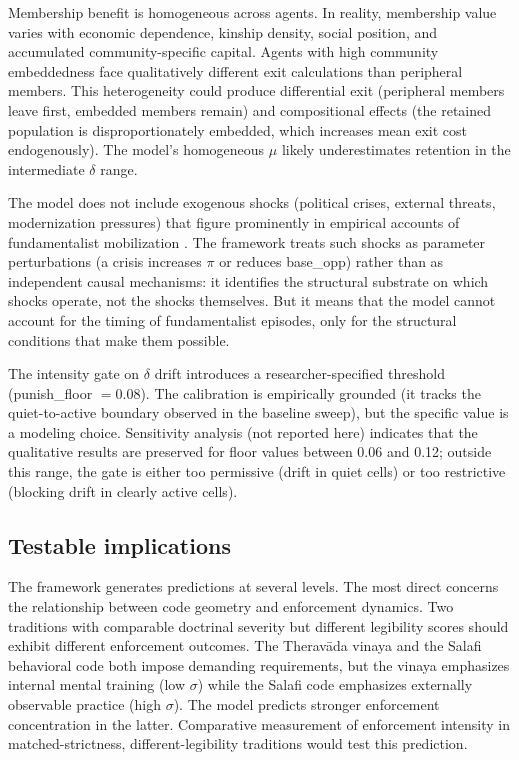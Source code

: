 \documentclass[12pt]{article}
\begin{document}
Membership benefit is homogeneous across agents. In reality, membership value varies with economic dependence, kinship density, social position, and accumulated community-specific capital. Agents with high community embeddedness face qualitatively different exit calculations than peripheral members. This heterogeneity could produce differential exit (peripheral members leave first, embedded members remain) and compositional effects (the retained population is disproportionately embedded, which increases mean exit cost endogenously). The model's homogeneous $\mu$ likely underestimates retention in the intermediate $\delta$ range.

The model does not include exogenous shocks (political crises, external threats, modernization pressures) that figure prominently in empirical accounts of fundamentalist mobilization \cite{almond2003}. The framework treats such shocks as parameter perturbations (a crisis increases $\pi$ or reduces base\_opp) rather than as independent causal mechanisms: it identifies the structural substrate on which shocks operate, not the shocks themselves. But it means that the model cannot account for the timing of fundamentalist episodes, only for the structural conditions that make them possible.

The intensity gate on $\delta$ drift introduces a researcher-specified threshold (punish\_floor $= 0.08$). The calibration is empirically grounded (it tracks the quiet-to-active boundary observed in the baseline sweep), but the specific value is a modeling choice. Sensitivity analysis (not reported here) indicates that the qualitative results are preserved for floor values between 0.06 and 0.12; outside this range, the gate is either too permissive (drift in quiet cells) or too restrictive (blocking drift in clearly active cells).

\subsection{Testable implications}

The framework generates predictions at several levels. The most direct concerns the relationship between code geometry and enforcement dynamics. Two traditions with comparable doctrinal severity but different legibility scores should exhibit different enforcement outcomes. The Therav\=ada vinaya and the Salafi behavioral code both impose demanding requirements, but the vinaya emphasizes internal mental training (low $\sigma$) while the Salafi code emphasizes externally observable practice (high $\sigma$). The model predicts stronger enforcement concentration in the latter. Comparative measurement of enforcement intensity in matched-strictness, different-legibility traditions would test this prediction.
\end{document}
